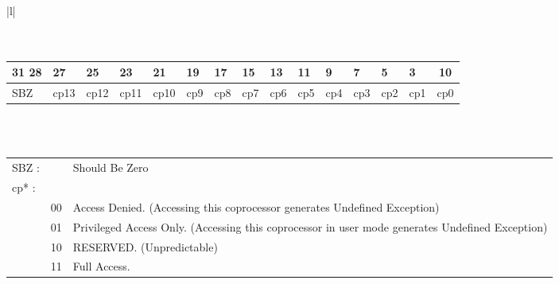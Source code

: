 \begin{center}
\begin{tabular}{|l|}
\hline
\\
\\
\\
	\begin{tabular}{|p{1cm}|*{14}{p{0.5cm}|}}
	\multicolumn{1}{c}{31 \hfill 28} & \multicolumn{1}{l}{27} & \multicolumn{1}{l}{25} & \multicolumn{1}{l}{23} & \multicolumn{1}{l}{21} & \multicolumn{1}{l}{19} & \multicolumn{1}{l}{17} & \multicolumn{1}{l}{15} & \multicolumn{1}{l}{13} & \multicolumn{1}{l}{11} & \multicolumn{1}{l}{9} & \multicolumn{1}{l}{7} & \multicolumn{1}{l}{5} & \multicolumn{1}{l}{3} & \multicolumn{1}{c}{1\hfill0} \\
	\hline
	SBZ & cp13 & cp12 & cp11 & cp10 & cp9 & cp8 & cp7 & cp6 & cp5 & cp4 & cp3 & cp2 & cp1 & cp0 \\
	\hline
	\end{tabular} \\
	\\
	\begin{tabular}{p{1cm}p{0.5cm}p{12cm}}
	SBZ : & & Should Be Zero \\
	cp* : \\
	& 00 & Access Denied. (Accessing this coprocessor generates Undefined Exception)\\
	& 01 & Privileged Access Only. (Accessing this coprocessor in user mode generates Undefined Exception)\\
	& 10 & RESERVED. (Unpredictable)\\
	& 11 & Full Access.\\
	\end{tabular} \\
\\
\hline
\end{tabular}
\end{center}
